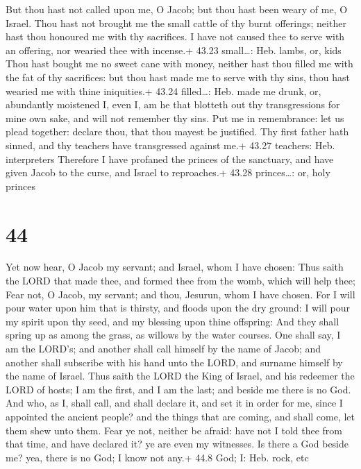  But thou hast not called upon me, O Jacob; but thou hast
been weary of me, O Israel.  Thou hast not brought me the
small cattle of thy burnt offerings; neither hast thou honoured me with
thy sacrifices. I have not caused thee to serve with an offering, nor
wearied thee with incense.+ 43.23 small\ldots: Heb. lambs, or, kids
 Thou hast bought me no sweet cane with money, neither hast
thou filled me with the fat of thy sacrifices: but thou hast made me to
serve with thy sins, thou hast wearied me with thine iniquities.+ 43.24
filled\ldots: Heb. made me drunk, or, abundantly moistened 
I, even I, am he that blotteth out thy transgressions for mine own sake,
and will not remember thy sins.  Put me in remembrance: let
us plead together: declare thou, that thou mayest be justified.
 Thy first father hath sinned, and thy teachers have
transgressed against me.+ 43.27 teachers: Heb. interpreters
 Therefore I have profaned the princes of the sanctuary,
and have given Jacob to the curse, and Israel to reproaches.+ 43.28
princes\ldots: or, holy princes

\hypertarget{section-43}{%
\section{44}\label{section-43}}

 Yet now hear, O Jacob my servant; and Israel, whom I have
chosen:  Thus saith the LORD that made thee, and formed thee
from the womb, which will help thee; Fear not, O Jacob, my servant; and
thou, Jesurun, whom I have chosen.  For I will pour water
upon him that is thirsty, and floods upon the dry ground: I will pour my
spirit upon thy seed, and my blessing upon thine offspring: 
And they shall spring up as among the grass, as willows by the water
courses.  One shall say, I am the LORD's; and another shall
call himself by the name of Jacob; and another shall subscribe with his
hand unto the LORD, and surname himself by the name of Israel.
 Thus saith the LORD the King of Israel, and his redeemer
the LORD of hosts; I am the first, and I am the last; and beside me
there is no God.  And who, as I, shall call, and shall
declare it, and set it in order for me, since I appointed the ancient
people? and the things that are coming, and shall come, let them shew
unto them.  Fear ye not, neither be afraid: have not I told
thee from that time, and have declared it? ye are even my witnesses. Is
there a God beside me? yea, there is no God; I know not any.+ 44.8 God;
I: Heb. rock, etc

